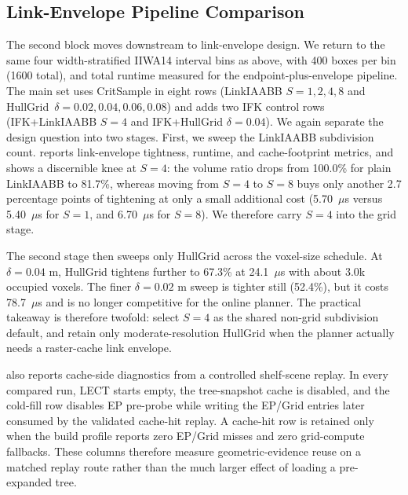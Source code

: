 \documentclass[journal]{IEEEtran}
\begin{document}
\subsection{Link-Envelope Pipeline Comparison}\label{sec:exp_linkenv}



The second block moves downstream to link-envelope design. We return to the
same four width-stratified IIWA14 interval bins as above, with 400 boxes per
bin (1600 total), and total runtime measured for the endpoint-plus-envelope
pipeline. The main set uses CritSample in eight rows (LinkIAABB $S=1,2,4,8$ and HullGrid
$\,\delta=0.02,0.04,0.06,0.08$) and adds two IFK control rows
(IFK+LinkIAABB $S=4$ and IFK+HullGrid $\delta=0.04$). We again separate the
design question into two stages.
First, we sweep the LinkIAABB subdivision count.  reports link-envelope tightness, runtime, and
cache-footprint metrics, and shows a discernible knee at $S=4$: the volume
ratio drops from 100.0\% for plain LinkIAABB to 81.7\%, whereas moving from
$S=4$ to $S=8$ buys only another 2.7 percentage points of tightening at
only a small additional cost (5.70~$\mu$s versus 5.40~$\mu$s for $S=1$,
and 6.70~$\mu$s for $S=8$). We therefore carry $S=4$ into the grid stage.

\begin{table}[t]
  \centering
  \caption{Shelf scene cold/warm build time comparison.}
  \label{tab:marcucci_envelope_build}
  \scriptsize
  \setlength{\tabcolsep}{2pt}
  \resizebox{\columnwidth}{!}{}
\end{table}



The second stage then sweeps only HullGrid across the voxel-size schedule.
At $\delta=0.04$ m, HullGrid tightens further to 67.3\% at 24.1~$\mu$s with
about 3.0k occupied voxels. The finer $\delta=0.02$ m sweep is tighter still
(52.4\%), but it costs 78.7~$\mu$s and is no longer competitive for the online
planner. The practical takeaway is therefore twofold: select $S=4$ as the
shared non-grid subdivision default, and retain only moderate-resolution
HullGrid when the planner actually needs a raster-cache link envelope.



 also reports cache-side diagnostics from a
controlled shelf-scene replay. In every compared run, LECT starts empty, the
tree-snapshot cache is disabled, and the cold-fill row disables EP pre-probe
while writing the EP/Grid entries later consumed by the validated cache-hit
replay. A cache-hit row is retained only when the build profile reports zero
EP/Grid misses and zero grid-compute fallbacks. These columns therefore measure
geometric-evidence reuse on a matched replay route rather than the much larger
effect of loading a pre-expanded tree.
\end{document}
